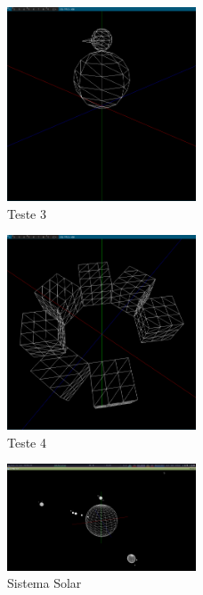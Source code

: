 \documentclass[14pt, a4paper]{article}
\begin{document}
\begin{figure}[ht]
\centering
\includegraphics[width=0.5\textwidth]{images/3.png}
\caption{Teste 3}
\end{figure}

\begin{figure}[ht]
\centering
\includegraphics[width=0.5\textwidth]{images/4.png}
\caption{Teste 4}
\end{figure}

\begin{figure}[ht]
\centering
\includegraphics[width=0.5\textwidth]{images/5.png}
\caption{Sistema Solar}
\end{figure}
\end{document}
